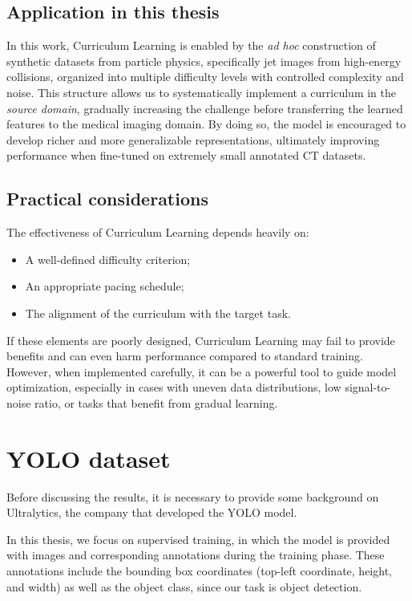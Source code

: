 \subsection*{Application in this thesis}
In this work, Curriculum Learning is enabled by the \textit{ad hoc} construction of synthetic datasets from particle physics, specifically jet images from high-energy collisions, organized into multiple difficulty levels with controlled complexity and noise. This structure allows us to systematically implement a curriculum in the \textit{source domain}, gradually increasing the challenge before transferring the learned features to the medical imaging domain. By doing so, the model is encouraged to develop richer and more generalizable representations, ultimately improving performance when fine-tuned on extremely small annotated CT datasets.

\subsection*{Practical considerations}
The effectiveness of Curriculum Learning depends heavily on:
\begin{itemize}
\item A well-defined difficulty criterion;
\item An appropriate pacing schedule;
\item The alignment of the curriculum with the target task.
\end{itemize}

If these elements are poorly designed, Curriculum Learning may fail to provide benefits and can even harm performance compared to standard training. However, when implemented carefully, it can be a powerful tool to guide model optimization, especially in cases with uneven data distributions, low signal-to-noise ratio, or tasks that benefit from gradual learning.

\newpage

\section{YOLO dataset}
Before discussing the results, it is necessary to provide some background on Ultralytics, the company that developed the YOLO model.

In this thesis, we focus on supervised training, in which the model is provided with images and corresponding annotations during the training phase. These annotations include the bounding box coordinates (top-left coordinate, height, and width) as well as the object class, since our task is object detection.

